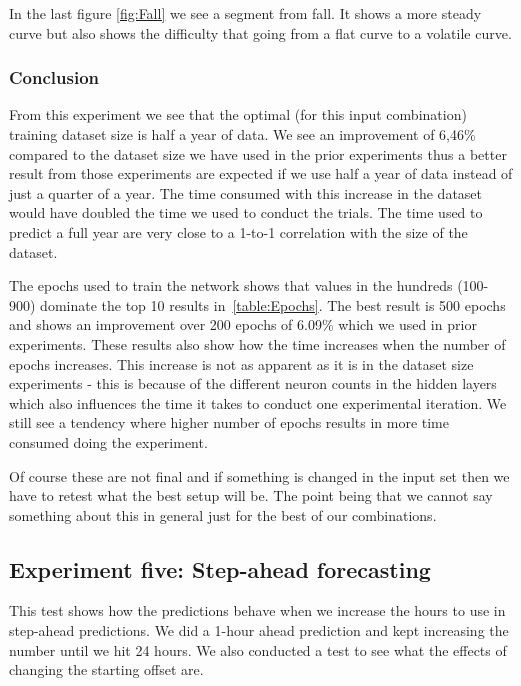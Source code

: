In the last figure \ref{fig:Fall} we see a segment from fall. It shows a more steady curve but also shows the difficulty that going from a flat curve to a volatile curve.

\subsubsection{Conclusion}
From this experiment we see that the optimal (for this input combination) training dataset size is half a year of data. We see an improvement of 6,46\% compared to the dataset size we have used in the prior experiments thus a better result from those experiments are expected if we use half a year of data instead of just a quarter of a year. The time consumed with this increase in the dataset would have doubled the time we used to conduct the trials. The time used to predict a full year are very close to a 1-to-1 correlation with the size of the dataset. 

The epochs used to train the network shows that values in the hundreds (100-900) dominate the top 10 results in~\ref{table:Epochs}. The best result is 500 epochs and shows an improvement over 200 epochs of 6.09\% which we used in prior experiments. These results also show how the time increases when the number of epochs increases. This increase is not as apparent as it is in the dataset size experiments - this is because of the different neuron counts in the hidden layers which also influences the time it takes to conduct one experimental iteration. We still see a tendency where higher number of epochs results in more time consumed doing the experiment.

Of course these are not final and if something is changed in the input set then we have to retest what the best setup will be. The point being that we cannot say something about this in general just for the best of our combinations.

\newpage
\subsection{Experiment five: Step-ahead forecasting}
\label{sec:priceExperimentFive}
This test shows how the predictions behave when we increase the hours to use in step-ahead predictions. We did a 1-hour ahead prediction and kept increasing the number until we hit 24 hours. We also conducted a test to see what the effects of changing the starting offset are.

